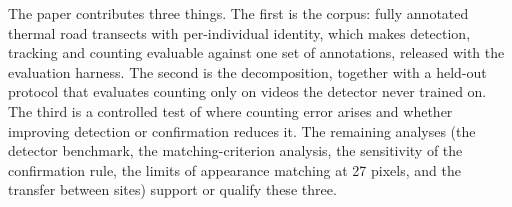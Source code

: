 The paper contributes three things. The first is the corpus: fully annotated thermal road
transects with per-individual identity, which makes detection, tracking and counting
evaluable against one set of annotations, released with the evaluation harness. The second is
the decomposition, together with a held-out protocol that evaluates counting only on videos
the detector never trained on. The third is a controlled test of where counting error arises
and whether improving detection or confirmation reduces it. The remaining analyses (the
detector benchmark, the matching-criterion analysis, the sensitivity of the confirmation
rule, the limits of appearance matching at 27 pixels, and the transfer between sites) support
or qualify these three.
